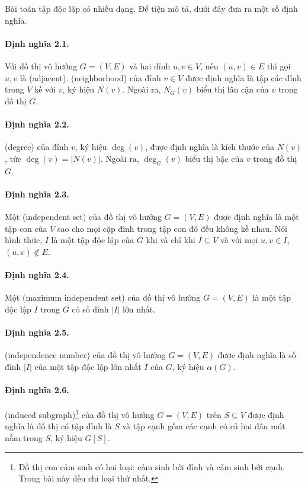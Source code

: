 \documentclass[11pt]{article}
\begin{document}
Bài toán tập độc lập có nhiều dạng. Để tiện mô tả, dưới đây đưa ra một số định
nghĩa.

\paragraph{Định nghĩa 2.1.}
Với đồ thị vô hướng \(G=(V,E)\) và hai đỉnh \(u,v\in V\), nếu \((u,v)\in E\)
thì gọi \(u,v\) là  (adjacent).  (neighborhood)
của đỉnh \(v\in V\) được định nghĩa là tập các đỉnh trong \(V\) kề với \(v\),
ký hiệu \(N(v)\). Ngoài ra, \(N_G(v)\) biểu thị lân cận của \(v\) trong đồ thị
\(G\).

\paragraph{Định nghĩa 2.2.}
 (degree) của đỉnh \(v\), ký hiệu \(\deg(v)\), được định nghĩa là
kích thước của \(N(v)\), tức \(\deg(v)=|N(v)|\). Ngoài ra, \(\deg_G(v)\) biểu
thị bậc của \(v\) trong đồ thị \(G\).

\paragraph{Định nghĩa 2.3.}
Một  (independent set) của đồ thị vô hướng \(G=(V,E)\) được
định nghĩa là một tập con của \(V\) sao cho mọi cặp đỉnh trong tập con đó đều
không kề nhau. Nói hình thức, \(I\) là một tập độc lập của \(G\) khi và chỉ khi
\(I\subseteq V\) và với mọi \(u,v\in I\), \((u,v)\notin E\).

\paragraph{Định nghĩa 2.4.}
Một  (maximum independent set) của đồ thị vô hướng
\(G=(V,E)\) là một tập độc lập \(I\) trong \(G\) có số đỉnh \(|I|\) lớn nhất.

\paragraph{Định nghĩa 2.5.}
 (independence number) của đồ thị vô hướng \(G=(V,E)\) được
định nghĩa là số đỉnh \(|I|\) của một tập độc lập lớn nhất \(I\) của \(G\), ký
hiệu \(\alpha(G)\).

\paragraph{Định nghĩa 2.6.}
 (induced subgraph)\footnote{Đồ thị con cảm sinh có
hai loại: cảm sinh bởi đỉnh và cảm sinh bởi cạnh. Trong bài này đều chỉ loại
thứ nhất.} của đồ thị vô hướng \(G=(V,E)\) trên \(S\subseteq V\) được định
nghĩa là đồ thị có tập đỉnh là \(S\) và tập cạnh gồm các cạnh có cả hai đầu mút
nằm trong \(S\), ký hiệu \(G[S]\).
\end{document}
